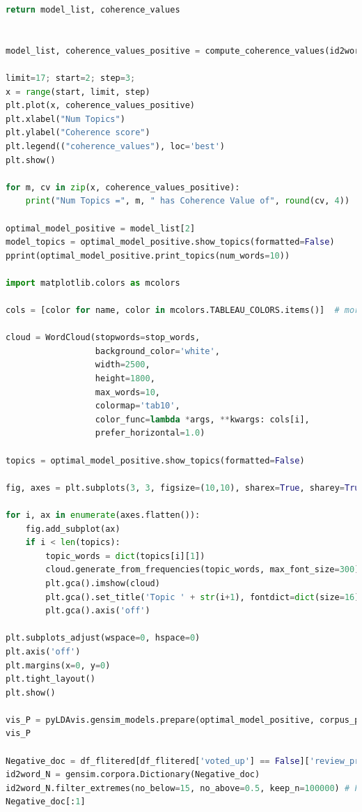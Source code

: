 \documentclass[12pt]{article}
\begin{document}
\begin{lstlisting}[language = Python]
    return model_list, coherence_values


model_list, coherence_values_positive = compute_coherence_values(id2word=id2word_P, corpus=corpus_positive, texts=Positive_doc, start=2, limit=17, step=3)

limit=17; start=2; step=3;
x = range(start, limit, step)
plt.plot(x, coherence_values_positive)
plt.xlabel("Num Topics")
plt.ylabel("Coherence score")
plt.legend(("coherence_values"), loc='best')
plt.show()

for m, cv in zip(x, coherence_values_positive):
    print("Num Topics =", m, " has Coherence Value of", round(cv, 4))
    
optimal_model_positive = model_list[2]
model_topics = optimal_model_positive.show_topics(formatted=False)
pprint(optimal_model_positive.print_topics(num_words=10))

import matplotlib.colors as mcolors

cols = [color for name, color in mcolors.TABLEAU_COLORS.items()]  # more colors: 'mcolors.XKCD_COLORS'

cloud = WordCloud(stopwords=stop_words,
                  background_color='white',
                  width=2500,
                  height=1800,
                  max_words=10,
                  colormap='tab10',
                  color_func=lambda *args, **kwargs: cols[i],
                  prefer_horizontal=1.0)

topics = optimal_model_positive.show_topics(formatted=False)

fig, axes = plt.subplots(3, 3, figsize=(10,10), sharex=True, sharey=True)

for i, ax in enumerate(axes.flatten()):
    fig.add_subplot(ax)
    if i < len(topics):
        topic_words = dict(topics[i][1])
        cloud.generate_from_frequencies(topic_words, max_font_size=300)
        plt.gca().imshow(cloud)
        plt.gca().set_title('Topic ' + str(i+1), fontdict=dict(size=16))
        plt.gca().axis('off')

plt.subplots_adjust(wspace=0, hspace=0)
plt.axis('off')
plt.margins(x=0, y=0)
plt.tight_layout()
plt.show()

vis_P = pyLDAvis.gensim_models.prepare(optimal_model_positive, corpus_positive, id2word_P)
vis_P

Negative_doc = df_flitered[df_flitered['voted_up'] == False]['review_preprocessed'].apply(lambda x: x.split()).tolist()
id2word_N = gensim.corpora.Dictionary(Negative_doc)
id2word_N.filter_extremes(no_below=15, no_above=0.5, keep_n=100000) # Filt extreme words
Negative_doc[:1]


\end{lstlisting}
\end{document}

